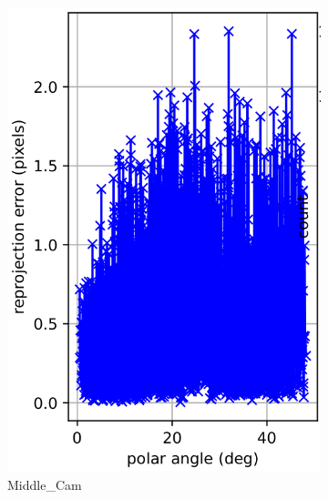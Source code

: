 \documentclass{article}
\begin{document}
\begin{figure}
\begin{subfigure}[b]{0.3\textwidth}
         \includegraphics[width=\textwidth]{cam1polar.png}
         \caption{Middle\_Cam}
     \end{subfigure}
     \hfill
     \begin{subfigure}[b]{0.3\textwidth}
         \centering

\end{subfigure}
\end{figure}
\end{document}
